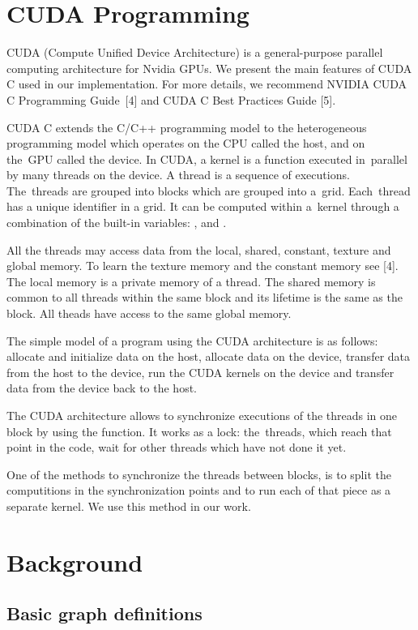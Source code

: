 \documentclass[a4paper, 11pt]{article}
\begin{document}
\section{CUDA Programming}

CUDA (Compute Unified Device Architecture) is a general-purpose parallel computing architecture 
for Nvidia GPUs. We present the main features of CUDA C used in our implementation. For more details, 
we recommend NVIDIA CUDA C Programming Guide~[4] and CUDA C Best Practices Guide [5]. 

CUDA C extends the C/C++ programming model to the heterogeneous programming model which operates on 
the CPU called the host, and on the~GPU called the device. In CUDA, a kernel is a function
executed in~parallel by many threads on the device. A thread is a sequence of executions. The~threads 
are grouped into blocks which are grouped into a~grid. Each~thread has a unique identifier in a grid. 
It can be computed within a~kernel through a combination of the built-in variables: 
,  and . 

All the threads may access data from the local, shared, constant, texture and global memory. To learn 
the texture memory and the constant memory see [4]. The local memory is a private memory of 
a thread. The shared memory is common to all threads within the same block and its lifetime is 
the same as the block. All theads have access to the same global memory.

The simple model of a program using the CUDA architecture is as follows: allocate and initialize
data on the host, allocate data on the device, transfer data from the host to the device, run the 
CUDA kernels on the device and transfer data from the device back to the host.

The CUDA architecture allows to synchronize executions of the threads in one block by using the 
 function. It works as a lock: the~threads, which reach that point in the code, wait for 
other threads which have not done it yet. 

One of the methods to synchronize the threads between blocks, is to split the computitions in 
the synchronization points and to run each of that piece as a separate kernel. We use this method 
in our work.

\section{Background}

\subsection{Basic graph definitions}
\end{document}
